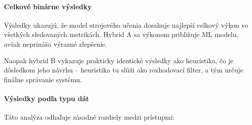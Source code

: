 \documentclass[conference]{IEEEtran}
\begin{document}
\paragraph{Celkové binárne výsledky}

\begin{table}[H]
\centering
\caption{Globálne porovnanie metód na jednotnom benchmarke}
\label{tab:global_comparison}
\footnotesize
\setlength{\tabcolsep}{4pt}
\renewcommand{\arraystretch}{1.1}
\end{table}
Výsledky ukazujú, že model strojového učenia dosahuje najlepší celkový výkon
vo všetkých sledovaných metrikách. Hybrid A sa výkonom približuje ML modelu,
avšak neprináša výrazné zlepšenie.

Naopak hybrid B vykazuje prakticky identické výsledky ako heuristika,
čo je dôsledkom jeho návrhu – heuristika tu slúži ako rozhodovací filter,
a tým určuje finálne správanie systému.

\paragraph{Výsledky podľa typu dát}

\begin{table}[H]
\centering
\caption{Výkon metód podľa typu dát (F1 skóre)}
\label{tab:method_performance}
\footnotesize
\setlength{\tabcolsep}{4pt}
\renewcommand{\arraystretch}{1.1}

\end{table}
Táto analýza odhaľuje zásadné rozdiely medzi prístupmi:
\end{document}

